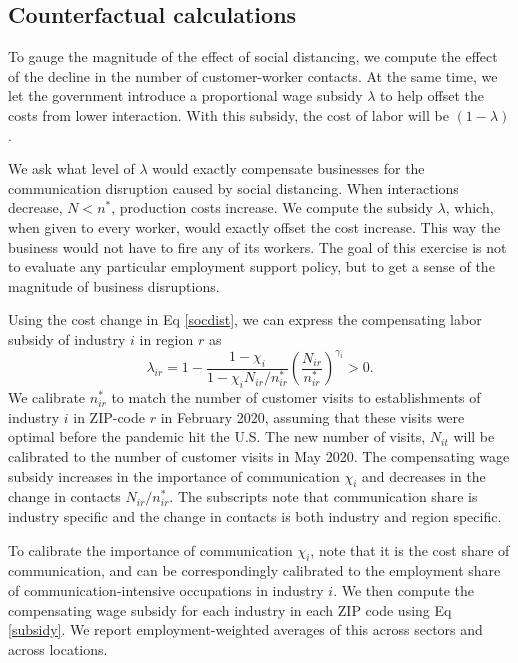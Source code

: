 \subsection*{Counterfactual calculations}
To gauge the magnitude of the effect of social distancing, we compute the effect of the decline in the number of customer-worker contacts. At the same time, we let the government introduce a proportional wage subsidy $\lambda$ to help offset the costs from lower interaction. With this subsidy, the cost of labor will be $(1-\lambda)$. 

We ask what level of $\lambda$ would exactly compensate businesses for the communication disruption caused by social distancing. When interactions decrease, $N<n^*$, production costs increase. We compute the subsidy $\lambda$, which, when given to every worker, would exactly offset the cost increase. This way the business would not have to fire any of its workers. The goal of this exercise is not to evaluate any particular employment support policy, but to get a sense of the magnitude of business disruptions. 

Using the cost change in Eq \ref{socdist}, we can express the compensating labor subsidy of industry $i$ in region $r$ as
\begin{equation}\label{subsidy}
    \lambda_{ir} = 1 -
        \frac{1-\chi_i}{1-\chi_i N_{ir}/n_{ir}^*}
        \left(
        \frac{N_{ir}}{n_{ir}^*}
        \right)^{\gamma_i}>0.
\end{equation}
We calibrate $n_{ir}^*$ to match the number of customer visits to establishments of industry $i$ in ZIP-code $r$ in February 2020, assuming that these visits were optimal before the pandemic hit the U.S. The new number of visits, $N_{it}$ will be calibrated to the number of customer visits in May 2020. The compensating wage subsidy increases in the importance of communication $\chi_i$ and decreases in the change in contacts $N_{ir}/n^*_{ir}$. The subscripts note that communication share is industry specific and the change in contacts is both industry and region specific.

To calibrate the importance of communication $\chi_i$, note that it is the cost share of communication, and can be correspondingly calibrated to the employment share of communication-intensive occupations in industry $i$. We then compute the compensating wage subsidy for each industry in each ZIP code using Eq \ref{subsidy}. We report employment-weighted averages of this across sectors and across locations.

